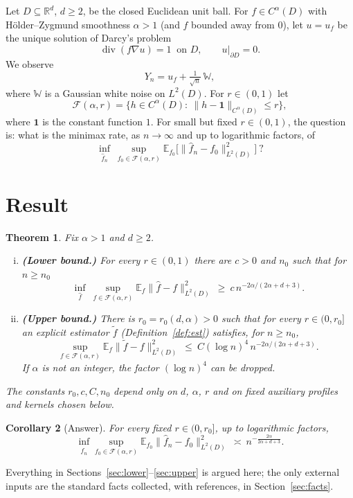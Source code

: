 \documentclass[11pt]{article}
\newtheorem{theorem}{Theorem}[section]
\newtheorem{corollary}[theorem]{Corollary}
\theoremstyle{definition}
\theoremstyle{remark}
\newcommand{\R}{\mathbb R}
\newcommand{\E}{\mathbb E}
\newcommand{\W}{\mathbb W}
\newcommand{\one}{\mathbf 1}
\newcommand{\Fc}{\mathcal F}
\newcommand{\dv}{\operatorname{div}}
\newcommand{\rate}{n^{-2\alpha/(2\alpha+d+3)}}
\begin{document}
Let $D\subseteq\R^d$, $d\ge2$, be the closed Euclidean unit ball. For $f\in C^\alpha(D)$ with H\"older--Zygmund smoothness $\alpha>1$ (and $f$ bounded away from $0$), let $u=u_f$ be the unique solution of Darcy's problem
\[
\dv(f\nabla u)=1\ \text{ on }D,\qquad u|_{\partial D}=0 .
\]
We observe
\[
Y_n=u_f+\tfrac1{\sqrt n}\,\W ,
\]
where $\W$ is a Gaussian white noise on $L^2(D)$. For $r\in(0,1)$ let
\[
\Fc(\alpha,r)=\{h\in C^\alpha(D):\ \|h-\one\|_{C^\alpha(D)}\le r\},
\]
where $\one$ is the constant function $1$. For small but fixed $r\in(0,1)$, the question is: what is the minimax rate, as $n\to\infty$ and up to logarithmic factors, of
\[
\inf_{\hat f_n}\ \sup_{f_0\in\Fc(\alpha,r)}\E_{f_0}\big[\|\hat f_n-f_0\|^2_{L^2(D)}\big]\ ?
\]

\section{Result}

\begin{theorem}\label{thm:main}
Fix $\alpha>1$ and $d\ge2$.
\begin{enumerate}[(i)]
\item \textbf{(Lower bound.)} For every $r\in(0,1)$ there are $c>0$ and $n_0$ such that for $n\ge n_0$
\[
\inf_{\hat f}\ \sup_{f\in\Fc(\alpha,r)}\E_f\|\hat f-f\|^2_{L^2(D)}\ \ge\ c\,\rate .
\]
\item \textbf{(Upper bound.)} There is $r_0=r_0(d,\alpha)>0$ such that for every $r\in(0,r_0]$ an explicit estimator $\tilde f$ (Definition~\ref{def:est}) satisfies, for $n\ge n_0$,
\[
\sup_{f\in\Fc(\alpha,r)}\E_f\|\tilde f-f\|^2_{L^2(D)}\ \le\ C(\log n)^4\,\rate .
\]
If $\alpha$ is not an integer, the factor $(\log n)^4$ can be dropped.
\end{enumerate}
The constants $r_0,c,C,n_0$ depend only on $d$, $\alpha$, $r$ and on fixed auxiliary profiles and kernels chosen below.
\end{theorem}

\begin{corollary}[Answer]
For every fixed $r\in(0,r_0]$, up to logarithmic factors,
\[
\inf_{\hat f_n}\sup_{f_0\in\Fc(\alpha,r)}\E_{f_0}\|\hat f_n-f_0\|^2_{L^2(D)}\ \asymp\ n^{-\frac{2\alpha}{2\alpha+d+3}} .
\]
\end{corollary}

Everything in Sections~\ref{sec:lower}--\ref{sec:upper} is argued here; the only external inputs are the standard facts collected, with references, in Section~\ref{sec:facts}.
\end{document}
